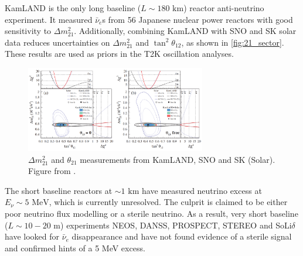 KamLAND is the only long baseline ($L\sim180\text{ km}$) reactor anti-neutrino experiment. It measured $\bar{\nu}_e$s from 56 Japanese nuclear power reactors with good sensitivity to $\Delta m^2_{21}$. Additionally, combining KamLAND with SNO and SK solar data reduces uncertainties on $\Delta m^2_{21}$ and $\tan^2\theta_{12}$, as shown in \autoref{fig:21_sector}. These results are used as priors in the T2K oscillation analyses.
\begin{figure}[h]
	\includegraphics[width=0.7\textwidth, trim={0mm 0mm 0mm 0mm}, clip,page=1]{figures/theory/kamland_solar_comb}
	\caption{$\Delta m^2_{21}$ and $\theta_{21}$ measurements from KamLAND, SNO and SK (Solar). Figure from \cite{kamland_2011}.}
	\label{fig:21_sector}
\end{figure}

The short baseline reactors at $\sim1\text{ km}$ have measured neutrino excess at $E_\nu\sim5\text{ MeV}$\cite{double_chooz, daya_bay, reno}, which is currently unresolved. The culprit is claimed to be either poor neutrino flux modelling or a sterile neutrino\cite{huber_neos,steriles}. As a result, very short baseline ($L\sim10-20\text{ m}$) experiments NEOS\cite{neos}, DANSS\cite{danss}, PROSPECT\cite{prospect}, STEREO\cite{stereo} and SoLi$\delta$\cite{solid} have looked for $\bar{\nu}_e$ disappearance and have not found evidence of a sterile signal and confirmed hints of a 5 MeV excess.